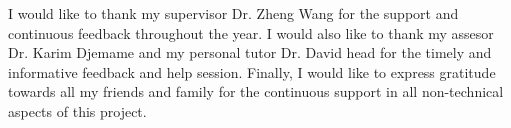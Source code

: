 I would like to thank my supervisor Dr. Zheng Wang for the support and
continuous feedback throughout the year. I would also like to thank my assesor
Dr. Karim Djemame and my personal tutor Dr. David head for the timely and
informative feedback and help session. Finally, I would like to express
gratitude towards all my friends and family for the continuous support in all
non-technical aspects of this project.
